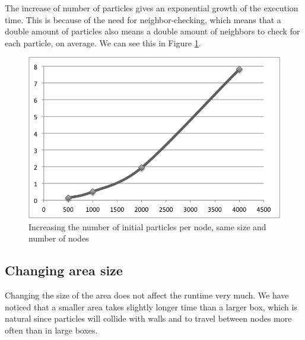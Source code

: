 \documentclass[a4paper]{article}
\begin{document}
The increase of number of particles gives an exponential growth of the
execution time. This is because of the need for neighbor-checking,
which means that a double amount of particles also means a double amount
of neighbors to check for each particle, on average. We can see this in
Figure \ref{fig2}.\\

\begin{figure}
  \centering
  \includegraphics{particles_scale.png}
  \caption{Increasing the number of initial particles per node, same size and number of nodes}
  \label{fig2}
\end{figure}

\subsection{Changing area size}

Changing the size of the area does not affect the runtime very much. We
have noticed that a smaller area takes slightly longer time than a
larger box, which is natural since particles will collide with walls and
to travel between nodes more often than in large boxes.\\
\end{document}
